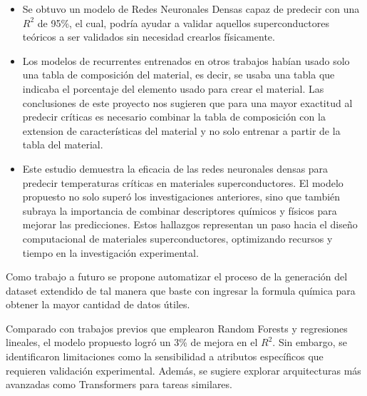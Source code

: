 \documentclass[conference]{IEEEtran} %
\begin{document}
\begin{itemize}
    \item Se obtuvo un modelo de Redes Neuronales Densas capaz de 
    predecir con una $R^2$ de 95\%, el cual, podría ayudar a validar
    aquellos superconductores teóricos a ser validados sin necesidad
    crearlos físicamente.
    \item Los modelos de recurrentes entrenados en otros trabajos 
    habían usado solo una tabla de composición del material, es 
    decir, se usaba una tabla que indicaba el porcentaje del 
    elemento usado para crear el material. Las conclusiones de este proyecto
    nos sugieren que para una mayor exactitud al predecir 
    críticas es necesario combinar la tabla de composición con 
    la extension de características del material y no solo entrenar a partir
    de la tabla del material.
    \item Este estudio demuestra la eficacia de las redes neuronales 
    densas para predecir temperaturas críticas en materiales 
    superconductores. El modelo propuesto no solo superó los investigaciones 
    anteriores, sino que también subraya la importancia de combinar 
    descriptores químicos y físicos para mejorar las predicciones. Estos 
    hallazgos representan un paso hacia el diseño computacional de 
    materiales superconductores, optimizando recursos y tiempo en la 
    investigación experimental.
    
\end{itemize}

Como trabajo a futuro se propone automatizar el proceso de la
generación del dataset extendido de tal manera que baste con ingresar la formula
química para obtener la mayor cantidad de datos útiles.

Comparado con trabajos previos que emplearon Random Forests y regresiones 
lineales, el modelo propuesto logró un 3\% de mejora en el $R^2$. Sin 
embargo, se identificaron limitaciones como la sensibilidad a atributos 
específicos que requieren validación experimental. Además, se sugiere 
explorar arquitecturas más avanzadas como Transformers para tareas 
similares.


\end{document}
